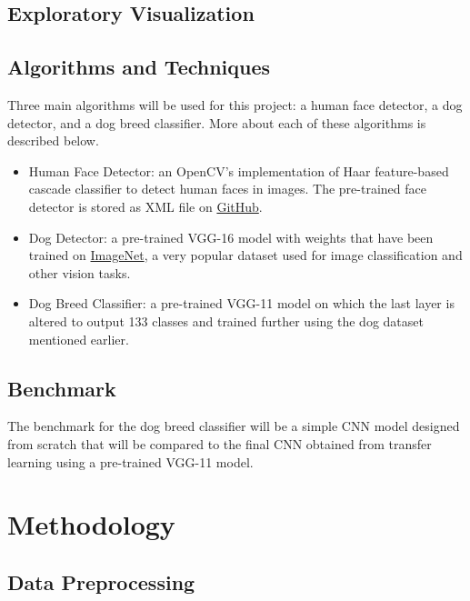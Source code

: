 \documentclass{article}
\begin{document}
    \subsection{Exploratory Visualization}

    \subsection{Algorithms and Techniques}

    Three main algorithms will be used for this project: a human face detector, a dog detector, and a dog breed classifier. More about each of these algorithms is described below.

    \begin{itemize}
        \item Human Face Detector: an OpenCV's implementation of Haar feature-based cascade classifier to detect human faces in images. The pre-trained face detector is stored as XML file on \href{https://github.com/opencv/opencv/tree/master/data/haarcascades}{GitHub}.
        
        \item Dog Detector: a pre-trained VGG-16 model with weights that have been trained on \href{https://image-net.org/}{ImageNet}, a very popular dataset used for image classification and other vision tasks.
        
        \item Dog Breed Classifier: a pre-trained VGG-11 model on which the last layer is altered to output 133 classes and trained further using the dog dataset mentioned earlier.
    \end{itemize}

    \subsection{Benchmark}

    The benchmark for the dog breed classifier will be a simple CNN model designed from scratch that will be compared to the final CNN obtained from transfer learning using a pre-trained VGG-11 model.

    \section{Methodology}

    \subsection{Data Preprocessing}
\end{document}
